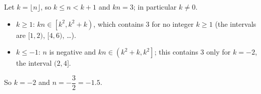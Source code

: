 Let $k=\lfloor n\rfloor$, so $k\le n<k+1$ and $kn=3$; in particular $k\ne0$.
\begin{itemize}
\item $k\ge1$: $kn\in\left[k^2,k^2+k\right)$, which contains $3$ for no integer $k\ge1$ (the intervals are $[1,2)$, $[4,6)$, \dots).
\item $k\le-1$: $n$ is negative and $kn\in\left(k^2+k,k^2\right]$; this contains $3$ only for $k=-2$, the interval $(2,4]$.
\end{itemize}
So $k=-2$ and $n=-\dfrac32=\boxed{-1.5}$.
